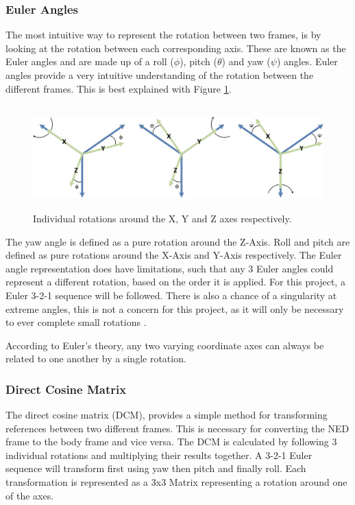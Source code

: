 		\subsubsection{Euler Angles}	
		The most intuitive way to represent the rotation between two frames, is by looking at the rotation between each corresponding axis. These are known as the Euler angles and are made up of a roll ($\phi$), pitch ($\theta$) and yaw ($\psi$) angles. Euler angles provide a very intuitive understanding of the rotation between the different frames. This is best explained with Figure \ref{IM_Euler}.
		
		\begin{figure}[H]
			\centering
			\includegraphics[height = 4cm]{Images/Literature/rotations.jpg}     
			\caption{Individual rotations around the X, Y and Z axes respectively.}
			\label{IM_Euler}
		\end{figure}
		
		The yaw angle is defined as a pure rotation around the Z-Axis. Roll and pitch are defined as pure rotations around the X-Axis and Y-Axis respectively. The Euler angle representation does have limitations, such that any 3 Euler angles could represent a different rotation, based on the order it is applied. For this project, a Euler 3-2-1 sequence will be followed. There is also a chance of a singularity at extreme angles, this is not a concern for this project, as it will only be necessary to ever complete small rotations \cite{quaternion, Moller2015}. 
		
		According to Euler's theory, any two varying coordinate axes can always be related to one another by a single rotation. 
			
		\subsubsection{Direct Cosine Matrix}
		The direct cosine matrix (DCM), provides a simple method for transforming references between two different frames. This is necessary for converting the NED frame to the body frame and vice versa. The DCM is calculated by following 3 individual rotations and multiplying their results together. A 3-2-1 Euler sequence will transform first using yaw then pitch and finally roll. Each transformation is represented as a 3x3 Matrix representing a rotation around one of the axes.
		
